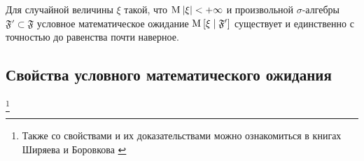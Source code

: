 \begin{comment}
Дальше распишем функцию $\varphi^{\eta}$,
пользуясь формулой \eqref{phiIntegral}
$$\integral{\Delta}{}{x}{
  \varphi^{\eta}\left( x \right) \cdot r\left( x \right)}
  = \integral{\Delta}{}{x}{\left(
      \frac{\integral{\mathbb{R}}{}{y}{y \cdot \pdf{x,y}}}
      {r\left( x \right)}
      \cdot r\left( x \right) \right)}$$

Сократим одинаковые плотности и получим интересный двойной интеграл
$$\integral{\Delta}{}{x}{\left(
      \frac{\integral{\mathbb{R}}{}{y}{y \cdot \pdf{x,y}}}
      {r\left( x \right)}
      \cdot r\left( x \right) \right)}
  = \integral{\Delta}{}{x}{
      \integral{\mathbb{R}}{}{y}{y \cdot \pdf{x,y}}}$$

Вернём индикатор обратно в интеграл
$$\integral{\Delta}{}{x}{
  \integral{\mathbb{R}}{}{y}{y \cdot \pdf{x,y} \cdot}}
  = \integral{\mathbb{R}}{}{x}{
      \integral{\mathbb{R}}{}{y}{y \cdot \indicator{x \in \Delta}
      \cdot \pdf{x,y}}}$$

Видим, что это и есть то математическое ожидание, которое нам нужно
$$\integral{\mathbb{R}}{}{x}{
  \integral{\mathbb{R}}{}{y}{y \cdot \indicator{x \in \Delta}
      \cdot \pdf{x,y}}}
  = \Mean{ \eta \cdot \indicatorof{\xi \in \Delta} }
  = \Mean{ \eta \cdot \indicatorof{A} }$$

Это значит, что тождество доказано и условное математическое ожидание
для случайных величин с совместной плотностью считается с помощью
$$\varphi^{\eta}\left( x \right)
  = \frac{\integral{\mathbb{R}}{}{y}{y \cdot \pdf{x,y}}}
      {\integral{\mathbb{R}}{}{y}{\pdf{x,y}}}$$

По формуле
$$\Mean{ \eta \mcond \xi }
  = \varphi^{\eta}\left( \xi \right)
  = \left. \varphi^{\eta}\left( x \right) \right|_{x= \xi}$$
\end{proof}
\end{comment}
\begin{theorem}
  Для случайной величины $\xi$ такой, что $\operatorname{M}_{} \left| \xi \right| < +\infty$
  и произвольной $\sigma$-алгебры $\mathfrak{F}' \subset \mathfrak{F}$ условное
  математическое ожидание $\operatorname{M}_{} \left[ \xi \;\middle|\; \mathfrak{F}' \right]$ существует и
  единственно с точностью до равенства почти наверное.
  \cite[стр.~142]{BorovkovMS}
\end{theorem}

\subsection{Свойства условного математического ожидания}
\footnote{Также
со свойствами и их доказательствами можно ознакомиться в книгах
Ширяева \cite[стр.~270]{Shiryayev1} и Боровкова \cite[стр.~143]{BorovkovMS}
}

